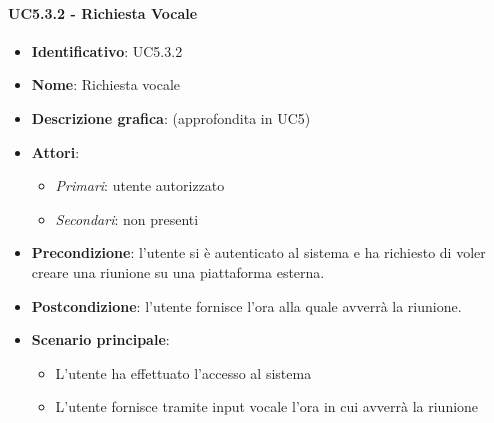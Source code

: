 \paragraph{UC5.3.2 - Richiesta Vocale}
\begin{itemize}
   \item \textbf{Identificativo}: UC5.3.2
   \item \textbf{Nome}: Richiesta vocale
   \item \textbf{Descrizione grafica}: (approfondita in UC5)
   \item \textbf{Attori}:
   \begin{itemize} 
       \item \textit{Primari}: utente autorizzato
       \item \textit{Secondari}: non presenti
   \end{itemize}
       \item \textbf{Precondizione}: l'utente si è autenticato al sistema e ha richiesto di voler creare una riunione su una piattaforma esterna.
       \item \textbf{Postcondizione}: l'utente fornisce l'ora alla quale avverrà la riunione.
    \item \textbf{Scenario principale}: 
       \begin{itemize}
           \item L'utente ha effettuato l'accesso al sistema 
           \item L'utente fornisce tramite input vocale l'ora in cui avverrà la riunione
       \end{itemize}
\end{itemize}


